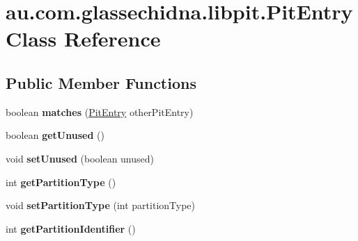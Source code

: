 \hypertarget{classau_1_1com_1_1glassechidna_1_1libpit_1_1PitEntry}{\section{au.\-com.\-glassechidna.\-libpit.\-Pit\-Entry Class Reference}
\label{classau_1_1com_1_1glassechidna_1_1libpit_1_1PitEntry}
}
\subsection*{Public Member Functions}
\begin{DoxyCompactItemize}
\item 
\hypertarget{classau_1_1com_1_1glassechidna_1_1libpit_1_1PitEntry_a82c3f25f61eea44457b6bd2dfecee3ab}{boolean {\bfseries matches} (\hyperlink{classau_1_1com_1_1glassechidna_1_1libpit_1_1PitEntry}{Pit\-Entry} other\-Pit\-Entry)}\label{classau_1_1com_1_1glassechidna_1_1libpit_1_1PitEntry_a82c3f25f61eea44457b6bd2dfecee3ab}

\item 
\hypertarget{classau_1_1com_1_1glassechidna_1_1libpit_1_1PitEntry_a61ff1d060d4a33892d31f0f16840f4aa}{boolean {\bfseries get\-Unused} ()}\label{classau_1_1com_1_1glassechidna_1_1libpit_1_1PitEntry_a61ff1d060d4a33892d31f0f16840f4aa}

\item 
\hypertarget{classau_1_1com_1_1glassechidna_1_1libpit_1_1PitEntry_aa8d624467b268f7b526c1fe0536a094e}{void {\bfseries set\-Unused} (boolean unused)}\label{classau_1_1com_1_1glassechidna_1_1libpit_1_1PitEntry_aa8d624467b268f7b526c1fe0536a094e}

\item 
\hypertarget{classau_1_1com_1_1glassechidna_1_1libpit_1_1PitEntry_a0e17a7ded5dcdc6f082b5c4dc8e0ac1e}{int {\bfseries get\-Partition\-Type} ()}\label{classau_1_1com_1_1glassechidna_1_1libpit_1_1PitEntry_a0e17a7ded5dcdc6f082b5c4dc8e0ac1e}

\item 
\hypertarget{classau_1_1com_1_1glassechidna_1_1libpit_1_1PitEntry_aa629644eee481ea6041771f8b58c86c1}{void {\bfseries set\-Partition\-Type} (int partition\-Type)}\label{classau_1_1com_1_1glassechidna_1_1libpit_1_1PitEntry_aa629644eee481ea6041771f8b58c86c1}

\item 
\hypertarget{classau_1_1com_1_1glassechidna_1_1libpit_1_1PitEntry_a401b166268b4ecfc9fee23ae05da52a8}{int {\bfseries get\-Partition\-Identifier} ()}\label{classau_1_1com_1_1glassechidna_1_1libpit_1_1PitEntry_a401b166268b4ecfc9fee23ae05da52a8}


\end{DoxyCompactItemize}
